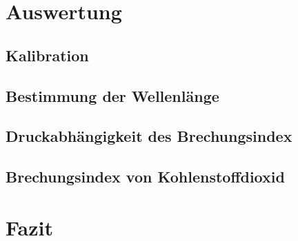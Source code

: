 \documentclass[12pt,a4paper]{article}
\begin{document}
\section{Auswertung}

\subsection{Kalibration}

\subsection{Bestimmung der Wellenlänge}

\subsection{Druckabhängigkeit des Brechungsindex}

\subsection{Brechungsindex von Kohlenstoffdioxid}

\section{Fazit}
\end{document}
